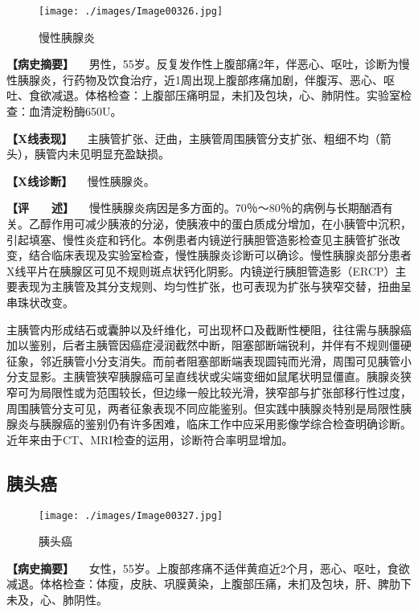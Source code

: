 \begin{figure}[!htbp]
 \centering
 \texttt{[image: ./images/Image00326.jpg]}
 \captionsetup{justification=centering}
 \caption{慢性胰腺炎}
 \label{fig5-9-1}
  \end{figure} 

\textbf{【病史摘要】}
　男性，55岁。反复发作性上腹部痛2年，伴恶心、呕吐，诊断为慢性胰腺炎，行药物及饮食治疗，近1周出现上腹部疼痛加剧，伴腹泻、恶心、呕吐、食欲减退。体格检查：上腹部压痛明显，未扪及包块，心、肺阴性。实验室检查：血清淀粉酶650U。

\textbf{【X线表现】}
　主胰管扩张、迂曲，主胰管周围胰管分支扩张、粗细不均（箭头），胰管内未见明显充盈缺损。

\textbf{【X线诊断】} 　慢性胰腺炎。

\textbf{【评　　述】}
　慢性胰腺炎病因是多方面的。70％～80％的病例与长期酗酒有关。乙醇作用可减少胰液的分泌，使胰液中的蛋白质成分增加，在小胰管中沉积，引起填塞、慢性炎症和钙化。本例患者内镜逆行胰胆管造影检查见主胰管扩张改变，结合临床表现及实验室检查，慢性胰腺炎诊断可以确诊。慢性胰腺炎部分患者X线平片在胰腺区可见不规则斑点状钙化阴影。内镜逆行胰胆管造影（ERCP）主要表现为主胰管及其分支规则、均匀性扩张，也可表现为扩张与狭窄交替，扭曲呈串珠状改变。

主胰管内形成结石或囊肿以及纤维化，可出现杯口及截断性梗阻，往往需与胰腺癌加以鉴别，后者主胰管因癌症浸润截然中断，阻塞部断端锐利，并伴有不规则僵硬征象，邻近胰管小分支消失。而前者阻塞部断端表现圆钝而光滑，周围可见胰管小分支显影。主胰管狭窄胰腺癌可呈直线状或尖端变细如鼠尾状明显僵直。胰腺炎狭窄可为局限性或为范围较长，但边缘一般比较光滑，狭窄部与扩张部移行性过度，周围胰管分支可见，两者征象表现不同应能鉴别。但实践中胰腺炎特别是局限性胰腺炎与胰腺癌的鉴别仍有许多困难，临床工作中应采用影像学综合检查明确诊断。近年来由于CT、MRI检查的运用，诊断符合率明显增加。

\subsection{胰头癌}

\begin{figure}[!htbp]
 \centering
 \texttt{[image: ./images/Image00327.jpg]}
 \captionsetup{justification=centering}
 \caption{胰头癌}
 \label{fig5-9-2}
  \end{figure} 

\textbf{【病史摘要】}
　女性，55岁。上腹部疼痛不适伴黄疸近2个月，恶心、呕吐，食欲减退。体格检查：体瘦，皮肤、巩膜黄染，上腹部压痛，未扪及包块，肝、脾肋下未及，心、肺阴性。

